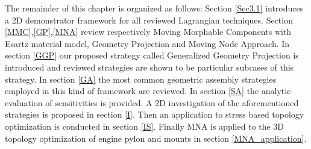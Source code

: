 The remainder of this chapter is organized as follows:
Section \ref{Sec3.1} introduces a 2D demonstrator framework for all reviewed Lagrangian techniques. Section \ref{MMC},\ref{GP},\ref{MNA} review respectively Moving Morphable Components with Esartz material model, Geometry Projection and Moving Node Approach. In section \ref{GGP} our proposed strategy called Generalized Geometry Projection is introduced and reviewed strategies are shown to be particular subcases of this strategy. In section \ref{GA} the most common geometric assembly strategies employed in this kind of framework are reviewed. In section \ref{SA} the analytic evaluation of sensitivities is provided. A 2D investigation of the aforementioned strategies is proposed in section \ref{I}. Then an application to stress based topology optimization is conducted in section \ref{IS}. Finally MNA is applied to the 3D topology optimization of engine pylon and mounts in section \ref{MNA_application}.

